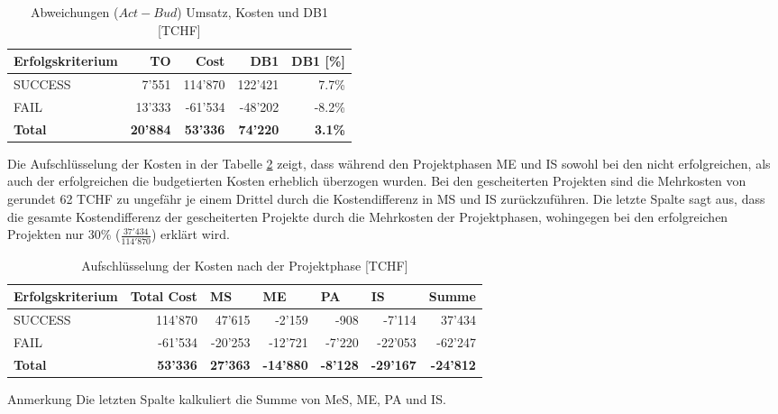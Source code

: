 \begin{table}[H]
	\centering
	\caption{Abweichungen ($Act-Bud$) Umsatz, Kosten und DB1 [TCHF]}
	\begin{tabular}{lrrrr}
		\textbf{Erfolgskriterium} & \textbf{TO} & \textbf{Cost} & \textbf{DB1}&
		\textbf{DB1 [\%]} \\\hline
		SUCCESS & 7'551 & 114'870 & 122'421 & 7.7\% \\
		FAIL  & 13'333 & -61'534 & -48'202 & -8.2\% \\\hline
		\textbf{Total} & \textbf{20'884} & \textbf{53'336} & \textbf{74'220} & \textbf{3.1\%} \\
	\end{tabular}
	\label{tab:Abw}%
\end{table}%
Die Aufschlüsselung der Kosten in der Tabelle \ref{tab:stocostdb1dev} zeigt, dass während den Projektphasen ME und IS sowohl bei den nicht erfolgreichen, als auch der erfolgreichen die budgetierten Kosten erheblich überzogen wurden. Bei den gescheiterten Projekten sind die Mehrkosten von gerundet 62 TCHF zu ungefähr je einem Drittel durch die Kostendifferenz in MS und IS zurückzuführen. Die letzte Spalte sagt aus, dass die gesamte Kostendifferenz der gescheiterten Projekte durch die Mehrkosten der Projektphasen, wohingegen bei den erfolgreichen Projekten nur 30\% ($\frac{37'434}{114'870}$)  erklärt wird.
\begin{table}[H]
	\centering
	\begin{threeparttable}
	\caption{Aufschlüsselung der Kosten nach der Projektphase [TCHF]}
	\begin{tabular}{lrrrrr|r}
		\toprule
		\textbf{Erfolgskriterium} & \multicolumn{1}{l}{\textbf{Total Cost}} & \multicolumn{1}{l}{\textbf{MS}} & \multicolumn{1}{l}{\textbf{ME}} & \multicolumn{1}{l}{\textbf{PA}} & \multicolumn{1}{l}{\textbf{IS}} & \multicolumn{1}{l}{\textbf{Summe}} \\
		\midrule
		SUCCESS & 114'870 & 47'615 & -2'159 & -908  & -7'114 & 37'434 \\
		FAIL  & -61'534 & -20'253 & -12'721 & -7'220 & -22'053 & -62'247 \\
		\bottomrule
		\textbf{ Total} & \textbf{53'336} & \textbf{ 27'363} & \textbf{ -14'880} & 
		\textbf{ -8'128} & \textbf{ -29'167} & \textbf{ -24'812} \\
	\end{tabular}%
	\begin{tablenotes}
		\tiny
		\item Anmerkung Die letzten Spalte kalkuliert die Summe von MeS, ME, PA und IS.
	\end{tablenotes}
	\label{tab:stocostdb1dev}%
	\end{threeparttable}
\end{table}%
